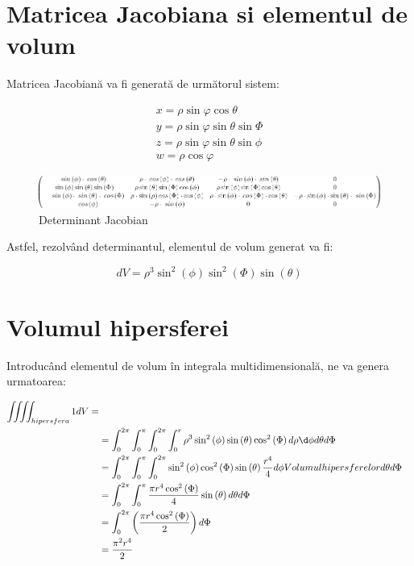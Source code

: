 \documentclass[12pt]{caltech_thesis}
\begin{document}
\section{Matricea Jacobiana si elementul de volum}

Matricea Jacobiană va fi generată de următorul sistem:

$$
\begin{array}{l}
x=\rho \sin \varphi \cos \theta \\
y=\rho \sin \varphi \sin \theta \sin \Phi \\
z=\rho \sin \varphi \sin \theta \sin \phi \\
w=\rho \cos \varphi
\end{array}
$$

\begin{figure}[hbt!]
\centering
\includegraphics[width=1\textwidth]{determinant.png}
\caption{Determinant Jacobian}\label{fig:logo}
\end{figure}

Astfel, rezolvând determinantul, elementul de volum generat va fi:

$$
d V=\rho^3\sin ^2\left(\phi\right)\sin ^2\left(\Phi\right)\sin \left(\theta\right)
$$

\section{Volumul hipersferei}

Introducând elementul de volum în integrala multidimensională, ne va genera urmatoarea:

$$
\begin{aligned}
\iiiint_{hipersfera} 1 d V= \\ 
&=\int _0^{2\pi }\int _0^{\pi }\int _0^{2\pi }\int _0^r\rho^3\sin ^2\left(\phi\right)\sin \left(\theta\right)\cos ^2\left(\Phi\right)d\rho\d\phi d\theta d\Phi \\
&=\int _0^{2\pi }\int _0^{\pi }\int _0^{2\pi }\sin ^2\left(\phi\right)\cos ^2\left(\Phi\right)\sin \left(\theta\right)\frac{r^4}{4}d\phi Volumul hipersferelord\theta d\Phi \\
&=\int _0^{2\pi }\int _0^{\pi }\frac{\pi r^4\cos ^2\left(\Phi\right)}{4}\sin \left(\theta\right)d\theta d\Phi \\
&=\int _0^{2\pi }\left(\frac{\pi r^4\cos ^2\left(\Phi\right)}{2}\right)d\Phi \\
&=\frac{\pi ^2r^4}{2}
\end{aligned}
$$
\end{document}

